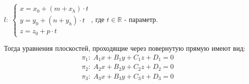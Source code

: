 \begin{center}
	$\mathit{l}: \; \begin{cases}
		x = x_0 + (m + x_h) \cdot t \\
		y = y_0 + (n + y_h) \cdot t \\
		z = z_0 + p \cdot t
	\end{cases}$, где $t \in \mathbb{R}$ - параметр. 
\end{center}

Тогда уравнения плоскостей, проходящие через повернутую прямую имеют вид:
$$\begin{gathered}
	\pi_1: \; A_1 x + B_1 y + C_1 z + D_1 = 0 \\
	\pi_2: \; A_2 x + B_2 y + C_2 z + D_2 = 0 \\
	\pi_3: \; A_3 x + B_3 y + C_3 z + D_3 = 0
\end{gathered}$$
